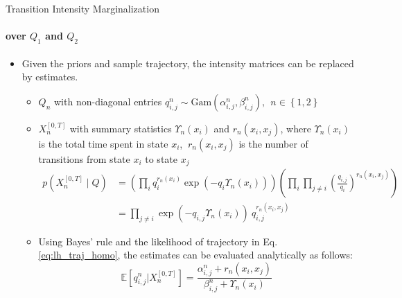 \documentclass[
english,%
aspectratio=169,%
color={accentcolor=3b},
logo=true,%
colorframetitle=false,%
]{tudabeamer}
\begin{document}
\begin{frame}{Transition Intensity Marginalization}
\framesubtitle{over $ Q_{1} $ and $ Q_{2} $}
\begin{itemize}
\item Given the priors and sample trajectory, the intensity matrices can be replaced by estimates. \cite{Studer2016}
\begin{itemize}
\item $Q_{n}$ with non-diagonal entries $ q^{n}_{i, j}\sim \mathrm{Gam}(\alpha^{n}_{i, j}, \beta^{n}_{i, j}),\ \ n \in \left\lbrace 1,2\right\rbrace $
\item $X_{n}^{[0,T]}$ with summary statistics $ \Upsilon_{n}(x_i) $ and $ r_{n}(x_i,x_j) $, where $ \Upsilon_{n}(x_i) $ is the total time spent in state $ x_i $, $\ r_{n}(x_i,x_j) $ is the number of transitions from state $ x_i $ to state $ x_j $
\begin{align}
p(X_n^{[0,T]}  \mid Q) &=\left(\prod_{ i} q_{i}^{r_n(x_{i})} \exp \left(-q_{i} \Upsilon_n(x_{i})\right)\right)\left(\prod_{ i} \prod_{ j \neq i} \left(\frac{q_{i,j}}{q_{i}}\right)^{r_n(x_{i}, x_{j})}\right) \nonumber\\ & = \prod_{j \neq i}  \exp(-q_{i,j}\Upsilon_n(x_{i}))\ q_{i,j}^{r_n(x_{i},x_{j})}
\label{eq:lh_traj_homo}
\end{align}
\item Using Bayes' rule and the likelihood of trajectory in Eq.\autoref{eq:lh_traj_homo}, the estimates can be evaluated analytically as follows:
\begin{equation}
\mathbb{E}\left[ q^{n}_{i,j} | X_n^{[0,T]}\right]=\frac{\alpha^{n}_{i,j}+r_{n}(x_i, x_j)}{\beta^{n}_{i, j}+\Upsilon_{n}(x_i)}
\label{eq:Q_estimate}
\end{equation}
\end{itemize}
\end{itemize}
\end{frame}
\end{document}
